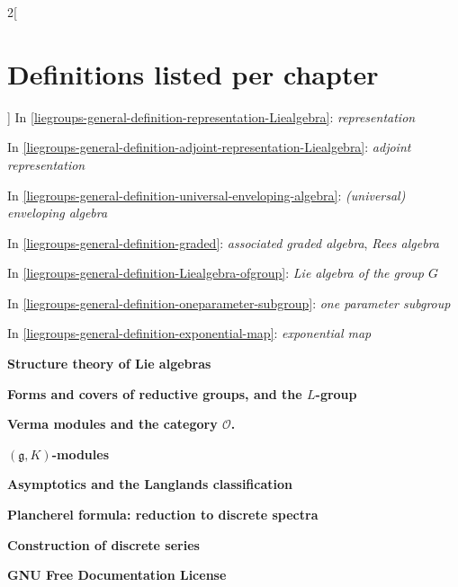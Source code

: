 \begin{multicols}{2}[\section{Definitions listed per chapter}\label{section-per-chapter}]
\noindent
In \ref{liegroups-general-definition-representation-Liealgebra}: 
{\it representation}


\noindent
In \ref{liegroups-general-definition-adjoint-representation-Liealgebra}: 
{\it adjoint representation}


\noindent
In \ref{liegroups-general-definition-universal-enveloping-algebra}: 
{\it (universal) enveloping algebra}


\noindent
In \ref{liegroups-general-definition-graded}: 
{\it associated graded algebra},
{\it Rees algebra}


\noindent
In \ref{liegroups-general-definition-Liealgebra-ofgroup}: 
{\it Lie algebra of the group $G$}


\noindent
In \ref{liegroups-general-definition-oneparameter-subgroup}: 
{\it one parameter subgroup}


\noindent
In \ref{liegroups-general-definition-exponential-map}: 
{\it exponential map}


\medskip\noindent
{\bf Structure theory of Lie algebras}

\medskip

\medskip\noindent
{\bf Forms and covers of reductive groups, and the $L$-group}

\medskip

\medskip\noindent
{\bf Verma modules and the category $\mathcal O$.}

\medskip

\medskip\noindent
{\bf $(\mathfrak g, K)$-modules}

\medskip

\medskip\noindent
{\bf Asymptotics and the Langlands classification}

\medskip

\medskip\noindent
{\bf Plancherel formula: reduction to discrete spectra}

\medskip

\medskip\noindent
{\bf Construction of discrete series}

\medskip

\medskip\noindent
{\bf GNU Free Documentation License}

\medskip
\end{multicols}



